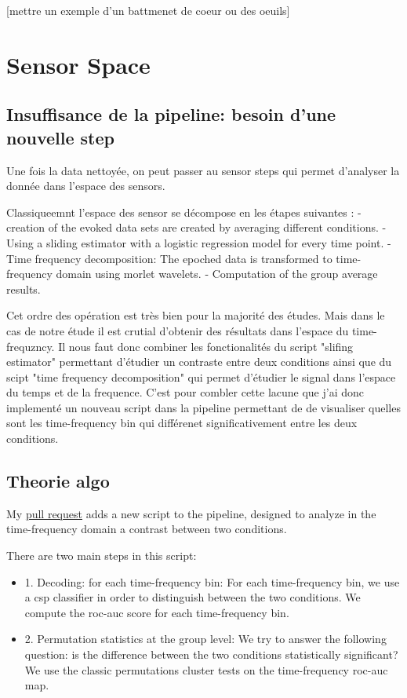 [mettre un exemple d'un battmenet de coeur ou des oeuils]




\section{Sensor Space}

\subsection{Insuffisance de la pipeline: besoin d'une nouvelle step}

Une fois la data nettoyée, on peut passer au sensor steps qui permet d'analyser la donnée dans l'espace des sensors.

Classiqueemnt l'espace des sensor se décompose en les étapes suivantes :
- creation of the evoked data sets are created by averaging different conditions.
- Using a sliding estimator with a logistic regression model for every time point.
- Time frequency decomposition: The epoched data is transformed to time-frequency domain using morlet wavelets.
- Computation of the group average results.

Cet ordre des opération est très bien pour la majorité des études. Mais dans le cas de notre étude il est crutial d'obtenir des résultats dans l'espace du time-frequzncy. Il nous faut donc combiner les fonctionalités du script "slifing estimator" permettant d'étudier un contraste entre deux conditions ainsi que du scipt "time frequency decomposition" qui permet d'étudier le signal dans l'espace du temps et de la frequence. C'est pour combler cette lacune que j'ai donc implementé un nouveau script dans la pipeline permettant de de visualiser quelles sont les time-frequency bin qui différenet significativement entre les deux conditions.


\subsection{Theorie algo}
My \href{https://github.com/mne-tools/mne-bids-pipeline/pull/414}{pull request} adds a new script to the pipeline, designed to analyze in the time-frequency domain a contrast between two conditions.

There are two main steps in this script:

\begin{itemize}
    \item 1. Decoding: for each time-frequency bin: For each time-frequency bin, we use a csp classifier in order to distinguish between the two conditions. We compute the roc-auc score for each time-frequency bin.
    \item 2. Permutation statistics at the group level: We try to answer the following question: is the difference between the two conditions statistically significant? We use the classic permutations cluster tests on the time-frequency roc-auc map.
\end{itemize}


